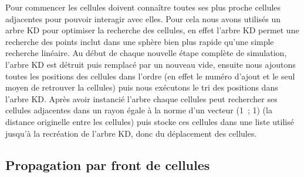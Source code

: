 \documentclass[a4paper,10pt]{article}
\begin{document}
Pour commencer les cellules doivent connaître toutes ses plus proche cellules adjacentes pour pouvoir interagir avec elles. Pour cela nous avons utilisés un arbre KD pour optimiser la recherche des cellules, en effet l'arbre KD permet une recherche des points inclut dans une sphère bien plus rapide qu'une simple recherche linéaire. Au début de chaque nouvelle étape complète de simulation, l'arbre KD est détruit puis remplacé par un nouveau vide, ensuite nous ajoutons toutes les positions des cellules dans l'ordre (en effet le numéro d'ajout et le seul moyen de retrouver la cellules) puis nous exécutons le tri des positions dans l'arbre KD. Après avoir instancié l'arbre chaque cellules peut rechercher ses cellules adjacentes dans un rayon égale à la norme d'un vecteur (1~; 1) (la distance originelle entre les cellules) puis stocke ces cellules dans une liste utilisé jusqu’à la recréation de l'arbre KD, donc du déplacement des cellules.

\subsection{Propagation par front de cellules}
\end{document}
